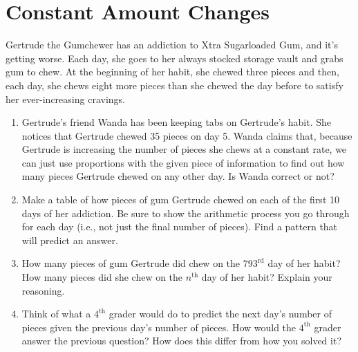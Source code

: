 \newpage
\section{Constant Amount Changes}\label{A:ConstantAmount}

\begin{prob}
Gertrude the Gumchewer has an addiction to Xtra Sugarloaded Gum, and it's getting worse.  Each day, she goes to her always stocked storage vault and grabs gum to chew.  At the beginning of her habit, she chewed three pieces and then, each day, she chews eight more pieces than she chewed the day before to satisfy her ever-increasing cravings.
\begin{enumerate}
\item Gertrude's friend Wanda has been keeping tabs on Gertrude's habit.  She notices that Gertrude chewed 35 pieces on day 5.  Wanda claims that, because Gertrude is increasing the number of pieces she chews at a constant rate, we can just use proportions with the given piece of information to find out how many pieces Gertrude chewed on any other day.  Is Wanda correct or not?

\item Make a table of how pieces of gum Gertrude chewed on each of the first 10 days of her addiction.  Be sure to show the arithmetic process you go through for each day (i.e., not just the final number of pieces).  Find a pattern that will predict an answer.  

\item How many pieces of gum Gertrude did chew on the $793^\mathrm{rd}$ day of her habit?  How many pieces did she chew on the $n^\mathrm{th}$ day of her habit?  Explain your reasoning.  

\item Think of what a $4^\mathrm{th}$ grader would do to predict the next day's number of pieces given the previous day's number of pieces.  How would the $4^\mathrm{th}$ grader answer the previous question?  How does this differ from how you solved it?


\end{enumerate}
\end{prob}
